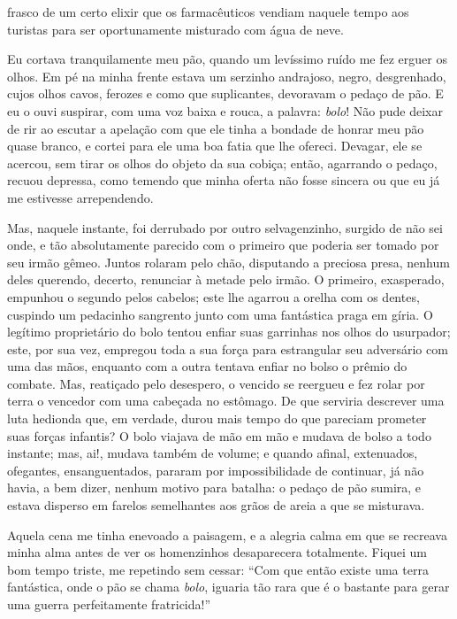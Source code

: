 \quebra

\noindent{}frasco de um certo elixir que os farmacêuticos
vendiam naquele tempo aos turistas para ser oportunamente misturado com
água de neve.

Eu cortava tranquilamente meu pão, quando um levíssimo ruído me fez
erguer os olhos. Em pé na minha frente estava um serzinho andrajoso,
negro, desgrenhado, cujos olhos cavos, ferozes e como que suplicantes,
devoravam o pedaço de pão. E eu o ouvi suspirar, com uma voz baixa e
rouca, a palavra: \textit{bolo}! Não pude deixar de rir ao escutar a apelação
com que ele tinha a bondade de honrar meu pão quase branco, e cortei
para ele uma boa fatia que lhe ofereci. Devagar, ele se acercou,
sem tirar os olhos do objeto da sua cobiça; então, agarrando o pedaço,
recuou depressa, como temendo que minha oferta não fosse sincera ou
que eu já me estivesse arrependendo.

Mas, naquele instante, foi derrubado por outro selvagenzinho, surgido de
não sei onde, e tão absolutamente parecido com o primeiro que poderia
ser tomado por seu irmão gêmeo. Juntos rolaram pelo chão, disputando a
preciosa presa, nenhum deles querendo, decerto, renunciar à metade
pelo irmão. O primeiro, exasperado, empunhou o segundo pelos cabelos;
este lhe agarrou a orelha com os dentes, cuspindo um pedacinho
sangrento junto com uma fantástica praga em gíria. O legítimo proprietário do
bolo tentou enfiar suas garrinhas nos olhos do usurpador; este,
por sua vez, empregou toda a sua força para estrangular seu
adversário com uma das mãos, enquanto com a outra tentava enfiar no
bolso o prêmio do combate. Mas, reatiçado pelo desespero, o vencido
se reergueu e fez rolar por terra o vencedor com uma cabeçada no
estômago. De que serviria descrever uma luta hedionda que, em verdade,
durou mais tempo do que pareciam prometer suas forças infantis? O bolo
viajava de mão em mão e mudava de bolso a todo instante; mas, ai!,
mudava também de volume; e quando afinal, extenuados, ofegantes,
ensanguentados, pararam por impossibilidade de continuar, já não
havia, a bem dizer, nenhum motivo para batalha: o pedaço de pão sumira, e
estava disperso em farelos semelhantes aos grãos de areia a que se
misturava.

Aquela cena me tinha enevoado a paisagem, e a alegria calma em que
se recreava minha alma antes de ver os homenzinhos
desaparecera totalmente. Fiquei um bom tempo triste, me repetindo sem
cessar: ``Com que então existe uma terra fantástica, onde o pão
se chama \textit{bolo}, iguaria tão rara que é o bastante para gerar uma
guerra perfeitamente fratricida!''

